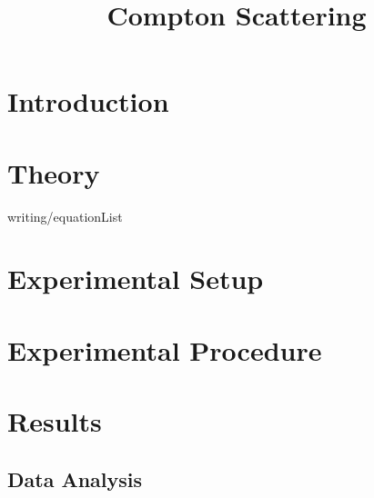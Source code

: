 \documentclass[12pt]{report}
\title{Compton Scattering}
\date{ }
\begin{document}



\tableofcontents
\listoffigures
\listoftables

\pagestyle{headings}

\pagestyle{plain}

\chapter{Introduction}



\chapter{Theory}



 {writing/equationList}

\chapter{Experimental Setup}

\chapter{Experimental Procedure}
\label{ch:procedure}



\chapter{Results}

\section{Data Analysis} %
\label{sec:Data Analysis}


	\begin{table}[h]
		\centering
		\begin{tabular}{|c|c|c|}
			\hline
			 
		\end{tabular}
	\end{table}
\end{document}
